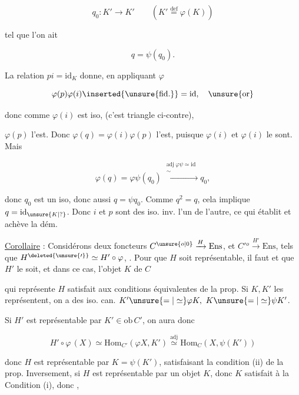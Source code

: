 \[
 q_0:K'\longrightarrow K'\qquad(K'\overset{\mathrm{def}}{=}\varphi(K))
\]

tel que l'on ait

\[
 q=\psi(q_0).
\]

La relation $pi=\mathrm{id}_K$ donne, en appliquant $\varphi$

\[
 \varphi(p)\varphi(i)\inserted{\unsure{\mathrm{fid.}}}=\mathrm{id},\quad\unsure{\text{or}}
\]

donc comme $\varphi(i)$ est iso, (c'est  triangle ci-contre),


$\varphi(p)$ l'est. Donc $\varphi(q)=\varphi(i)\varphi(p)$ l'est, puisque $\varphi(i)$ et $\varphi(i)$ le sont. Mais

\[
 \varphi(q)=\varphi\psi(q_0)\xrightarrow[\ ]{\substack{\mathrm{adj}\ \varphi\psi\simeq\mathrm{id}\\ \sim}}q_0,
\]

donc $q_0$ est un iso, donc aussi $q=\psi q_0$. Comme $q^2=q$, cela implique $q=\mathrm{id}_{\unsure{K|{?}}}$. Donc $i$ et $p$ sont des iso. inv. l'un de l'autre, ce qui établit  et achève la dém.

\uline{Corollaire} : Considérons deux foncteurs $C^{\unsure{o|0}}\xrightarrow{H}\mathrm{Ens}$, et $C'{}^o\xrightarrow{H'}\mathrm{Ens}$, tels que $H^{\deleted{\unsure{\prime}}}\simeq H'\circ\varphi$, . Pour que $H$ soit représentable, il faut et  que $H'$ le soit, et dans ce cas, l'objet $K$ de $C$


qui représente $H$ satisfait aux conditions équivalentes de la prop. Si $K,K'$ les représentent, on a des iso. can. $K'\unsure{=|\simeq}\varphi K,\ K\unsure{=|\simeq}\psi K'$.

Si $H'$ est représentable par $K'\in\mathrm{ob}\,C'$, on aura donc

\[
 H'\circ\varphi\,(X)\simeq\mathrm{Hom}_{C'}(\varphi X,K')\overset{\mathrm{adj}}{\simeq}
 \mathrm{Hom}_C(X,\psi(K'))
\]

donc $H$ est représentable par $K=\psi(K')$, satisfaisant la condition (ii) de la prop. Inversement, si  $H$ est représentable par un objet $K$, donc $K$ satisfait à la Condition (i), donc ,  

